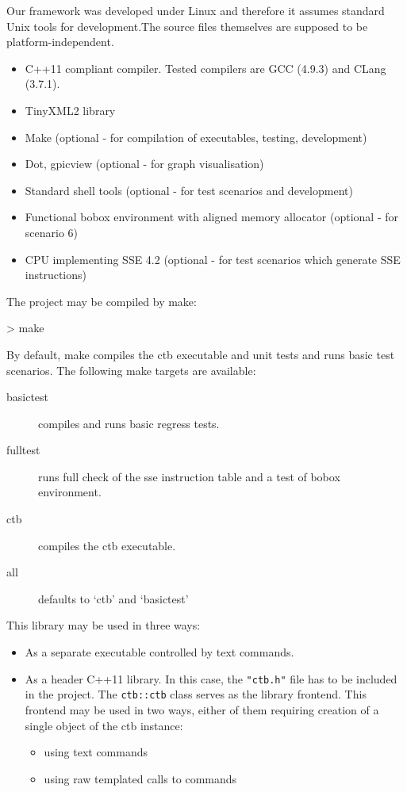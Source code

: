 Our framework was developed under Linux and therefore it assumes standard Unix tools for development.The source files themselves are supposed to be platform-independent. 

\begin{itemize}
  \item C++11 compliant compiler. Tested compilers are GCC (4.9.3) and CLang (3.7.1).
  \item TinyXML2 library 
  \item Make (optional - for compilation of executables, testing, development)
  \item Dot, gpicview (optional - for graph visualisation)
  \item Standard shell tools (optional - for test scenarios and development) 
  \item Functional bobox environment with aligned memory allocator (optional - for scenario 6)
  \item CPU implementing SSE 4.2  (optional - for test scenarios which generate SSE instructions)
\end{itemize}

The project may be compiled by make:
\begin{code}
> make
\end{code}

By default, make compiles the ctb executable and unit tests and runs basic test scenarios. The following make targets are available:

\begin{description}
  \item[basictest] compiles and runs basic regress tests.
  \item[fulltest] runs full check of the sse instruction table and a test of bobox environment.
  \item[ctb] compiles the ctb executable.
  \item[all] defaults to `ctb' and `basictest'
\end{description}


This library may be used in three ways:
\begin{itemize}
  \item As a separate executable controlled by text commands.
  \item As a header C++11 library. In this case, the \texttt{"ctb.h"} file has to be included in the project. The \texttt{ctb::ctb} class serves as the library frontend. This frontend may be used in two ways, either of them requiring creation of a single object of the ctb instance:
  \begin{itemize}
    \item using text commands
    \item using raw templated calls to commands
  \end{itemize}
\end{itemize}

